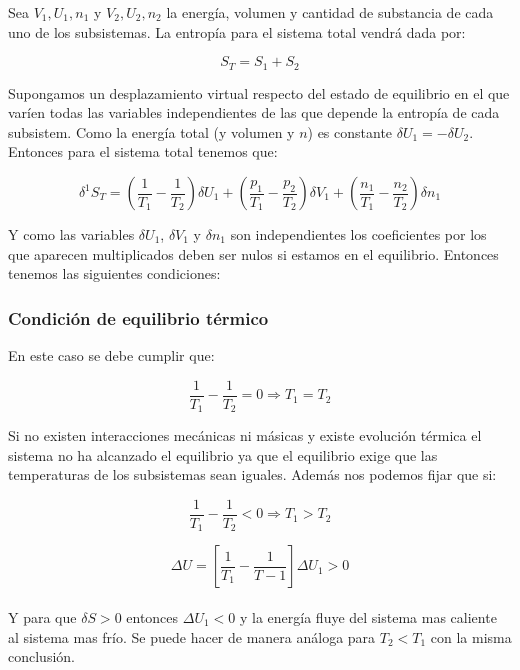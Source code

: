\documentclass[12pt,a4paper]{article}
\newcommand{\parentesis}[1]{\left( #1 \right)}
\begin{document}
Sea $V_1, U_1, n_1$ y $V_2, U_2, n_2$ la energía, volumen y cantidad de substancia de cada uno de los subsistemas. La entropía para el sistema total vendrá dada por:

$$ S_T = S_1 + S_2 $$

Supongamos un desplazamiento virtual respecto del estado de equilibrio en el que varíen todas las variables independientes de las que depende la entropía de cada subsistem. Como la energía total (y volumen y $n$) es constante $\delta U_1 = - \delta U_2$. Entonces para el sistema total tenemos que:

\begin{equation}
\delta^1 S_T = \parentesis{\dfrac{1}{T_1}-\dfrac{1}{T_2}} \delta U_1 + \parentesis{\dfrac{p_1}{T_1}-\dfrac{p_2}{T_2}} \delta V_1 + \parentesis{\dfrac{n_1}{T_1}-\dfrac{n_2}{T_2}} \delta n_1
\end{equation}
 
Y como las variables $\delta U_1$, $\delta V_1$ y $\delta n_1$ son independientes los coeficientes por los que aparecen multiplicados deben ser nulos si estamos en el equilibrio. Entonces tenemos las siguientes condiciones:

\subsubsection{Condición de equilibrio térmico}

En este caso se debe cumplir que:

\begin{equation}
\dfrac{1}{T_1} - \dfrac{1}{T_2} = 0 \Longrightarrow T_1 = T_2
\end{equation}

Si no existen interacciones mecánicas ni másicas y existe evolución térmica el sistema no ha alcanzado el equilibrio ya que el equilibrio exige que las temperaturas de los subsistemas sean iguales. Además nos podemos fijar que si:

\begin{equation}
\dfrac{1}{T_1} - \dfrac{1}{T_2} < 0 \Longrightarrow T_1 > T_2 
\end{equation}


\begin{equation}
\Delta U = \left[ \dfrac{1}{T_1} - \dfrac{1}{T-1} \right] \Delta U_1 > 0
\end{equation} \\

Y para que $\delta S > 0$ entonces $\Delta U_1 < 0$ y la energía fluye del sistema mas caliente al sistema mas frío. Se puede hacer de manera análoga para $T_2 < T_1$ con la misma conclusión.  \\
\end{document}
